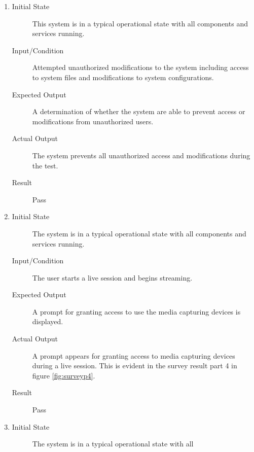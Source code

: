 \documentclass[12pt, titlepage]{article}
\begin{document}
\begin{enumerate}[NFR-T1]
  \item \label{NFRT23}
    \begin{description}
    \item[Initial State] This system is in a typical operational state with all
      components and services running.
    \item[Input/Condition] Attempted unauthorized modifications to the system
      including access to system files and modifications to system
      configurations.
    \item[Expected Output] A determination of whether the system are able to
      prevent access or modifications from unauthorized users.
    \item[Actual Output] The system prevents all unauthorized access and
      modifications during the test.
    \item[Result] Pass
    \end{description}
  \item \label{NFRT24}
    \begin{description}
    \item[Initial State] The system is in a typical operational state with all
      components and services running.
    \item[Input/Condition] The user starts a live session and begins streaming.
    \item[Expected Output] A prompt for granting access to use the media capturing
      devices is displayed.
    \item[Actual Output] A prompt appears for granting access to media capturing
      devices during a live session. This is evident in the survey result
      part 4 in figure \ref{fig:surveyp4}.
    \item[Result] Pass
    \end{description}
  \item \label{NFRT25}
    \begin{description}
    \item[Initial State] The system is in a typical operational state with all

\end{description}
\end{enumerate}
\end{document}
